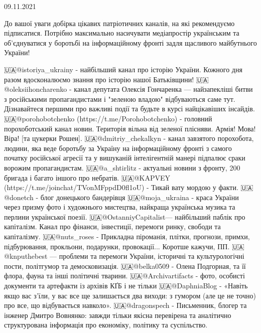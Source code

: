  
 
 
 
 

09.11.2021

До вашої уваги добірка цікавих патріотичних каналів, на які рекомендуємо
підписатися. Потрібно максимально насичувати медіапростір українським та
об'єднуватися у боротьбі на інформаційному фронті задля щасливого майбутнього
України! 

🇺🇦@istoriya_ukrainy - найбільший канал про історію України. Кожного дня разом вдосконалюємо знання про історію нашої Батьківщини!
🇺🇦@oleksiihoncharenko -  канал депутата Олексія Гончаренка — найзапекліші битви з російськими пропагандистами і "зеленою владою" відбуваються саме тут. Дізнавайтеся першими про важливі події та будьте в курсі найцікавіших інсайдів.
🇺🇦@porohobotchenko (https://t.me/Porohobotchenko) - головний порохоботський канал новин. Територія вільна від зеленої плісняви. Армія! Мова! Віра! [та цукерки Рошен]. 
🇺🇦@dmitriy_chekalkyn - канал завзятого порохобота, людини, яка веде боротьбу за Україну на інформаційному фронті з самого початку російської агресії та у вишуканій інтелігентній манері підпалює сраки ворожим пропагандистам. 
🇺🇦@a_shtirlitz - актуальні новини з фронту, 200 бригада і багато іншого про небратів.
🇺🇦@KAPVEY (https://t.me/joinchat/TVonMFppdD0fl1oU) - Тикай вату мордою у факти.
🇺🇦@donetch - блог донецького бандерівця
🇺🇦@moja_ukraina - краса України через призму фото і художнього мистецтва, найкраща українська музика та перлини української поезії.
🇺🇦@OstanniyCapitalist— найбільший паблік про капіталізм. Канал про фінанси, інвестиції, перемоги ринку, свободи та капіталізму.
🇺🇦@nuts_roses - Прикладна піроманія, плітки, прогнози, примхи, підбурювання, прокльони, подарунки, провокації... Коротше кажучи, ПП.
🇺🇦@knputhebest — проблеми та перемоги України, історичні та культурологічні пости,  політгумор та демосковизація.
🇺🇦@belka0509 - Олена Подгорная, та її флора, фауна та інші політичні тварини.
🇺🇦@Archivartifacts - фото, особисті документи та артефакти із архівів КҐБ і не тільки
🇺🇦@DaphniaBlog - «Навіть якщо вас з'їли, у вас все ще залишається два виходи: з гумором (але це не точно) про все, що відбувається навколо».
🇺🇦@dragonspech - Письменник, блогер та інженер Дмитро Вовнянко: завжди тільки якісна перевірена та аналітично структурована інформація про економіку, політику та суспільство.
